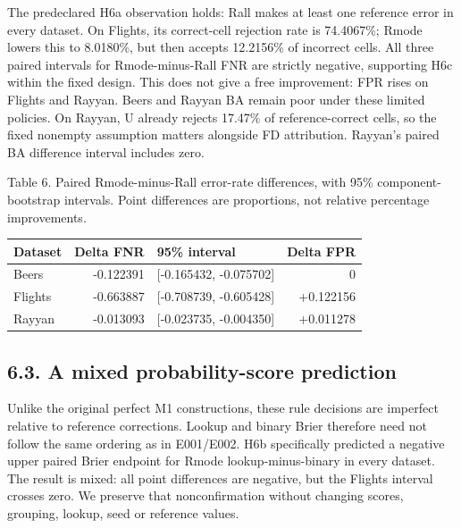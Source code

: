 The predeclared H6a observation holds: Rall makes at least one reference
error in every dataset. On Flights, its correct-cell rejection rate is
74.4067\%; Rmode lowers this to 8.0180\%, but then accepts 12.2156\% of
incorrect cells. All three paired intervals for Rmode-minus-Rall FNR are
strictly negative, supporting H6c within the fixed design. This does not
give a free improvement: FPR rises on Flights and Rayyan. Beers and
Rayyan BA remain poor under these limited policies. On Rayyan, U already
rejects 17.47\% of reference-correct cells, so the fixed nonempty
assumption matters alongside FD attribution. Rayyan's paired BA
difference interval includes zero.

\noindent\begin{minipage}{\linewidth}
\noindent Table 6. Paired Rmode-minus-Rall error-rate differences, with 95\%
component-bootstrap intervals. Point differences are proportions, not
relative percentage improvements.
\par\medskip\centering
\begin{tabular}{@{}lrlr@{}}
\toprule
Dataset & Delta FNR & 95\% interval & Delta FPR \\
\midrule

Beers & -0.122391 & {[}-0.165432, -0.075702{]} & 0 \\
Flights & -0.663887 & {[}-0.708739, -0.605428{]} & +0.122156 \\
Rayyan & -0.013093 & {[}-0.023735, -0.004350{]} & +0.011278 \\
\bottomrule
\end{tabular}
\end{minipage}


\hypertarget{a-mixed-probability-score-prediction}{%
\subsection{6.3. A mixed probability-score
prediction}\label{a-mixed-probability-score-prediction}}

Unlike the original perfect M1 constructions, these rule decisions are
imperfect relative to reference corrections. Lookup and binary Brier
therefore need not follow the same ordering as in E001/E002. H6b
specifically predicted a negative upper paired Brier endpoint for Rmode
lookup-minus-binary in every dataset. The result is mixed: all point
differences are negative, but the Flights interval crosses zero. We
preserve that nonconfirmation without changing scores, grouping, lookup,
seed or reference values.

